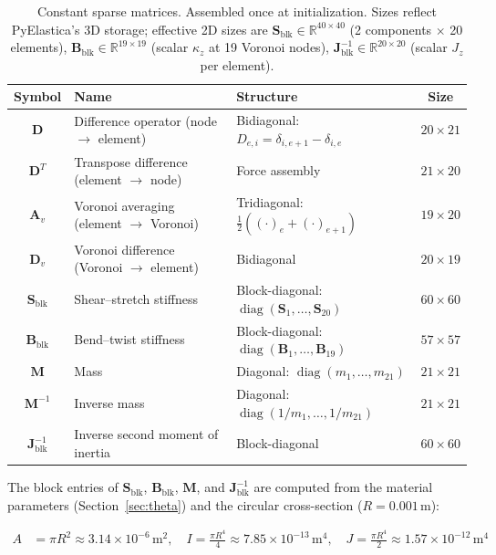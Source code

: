 \documentclass[11pt]{article}
\newcommand{\mat}[1]{\mathbf{#1}}
\newcommand{\Real}{\mathbb{R}}
\begin{document}
\begin{table}[H]
  \centering
  \renewcommand{\arraystretch}{1.3}
  \begin{tabular}{cllc}
    \toprule
    Symbol & Name & Structure & Size \\
    \midrule
    $\mat{D}$ & Difference operator (node $\to$ element) & Bidiagonal: $D_{e,i} = \delta_{i,e+1} - \delta_{i,e}$ & $20 \times 21$ \\
    $\mat{D}^T$ & Transpose difference (element $\to$ node) & Force assembly & $21 \times 20$ \\
    $\mat{A}_v$ & Voronoi averaging (element $\to$ Voronoi) & Tridiagonal: $\tfrac{1}{2}((\cdot)_e + (\cdot)_{e+1})$ & $19 \times 20$ \\
    $\mat{D}_v$ & Voronoi difference (Voronoi $\to$ element) & Bidiagonal & $20 \times 19$ \\
    $\mat{S}_{\text{blk}}$ & Shear--stretch stiffness & Block-diagonal: $\operatorname{diag}(\mat{S}_1, \ldots, \mat{S}_{20})$ & $60 \times 60$ \\
    $\mat{B}_{\text{blk}}$ & Bend--twist stiffness & Block-diagonal: $\operatorname{diag}(\mat{B}_1, \ldots, \mat{B}_{19})$ & $57 \times 57$ \\
    $\mat{M}$ & Mass & Diagonal: $\operatorname{diag}(m_1, \ldots, m_{21})$ & $21 \times 21$ \\
    $\mat{M}^{-1}$ & Inverse mass & Diagonal: $\operatorname{diag}(1/m_1, \ldots, 1/m_{21})$ & $21 \times 21$ \\
    $\mat{J}_{\text{blk}}^{-1}$ & Inverse second moment of inertia & Block-diagonal & $60 \times 60$ \\
    \bottomrule
  \end{tabular}
  \caption{Constant sparse matrices.  Assembled once at initialization.
    Sizes reflect PyElastica's 3D storage; effective 2D sizes are $\mat{S}_{\text{blk}} \in \Real^{40 \times 40}$ (2 components $\times$ 20 elements), $\mat{B}_{\text{blk}} \in \Real^{19 \times 19}$ (scalar $\kappa_z$ at 19 Voronoi nodes), $\mat{J}_{\text{blk}}^{-1} \in \Real^{20 \times 20}$ (scalar $J_z$ per element).}
  \label{tab:constant-matrices}
\end{table}

\noindent
The block entries of $\mat{S}_{\text{blk}}$, $\mat{B}_{\text{blk}}$, $\mat{M}$, and $\mat{J}_{\text{blk}}^{-1}$ are computed from the material parameters (Section~\ref{sec:theta}) and the circular cross-section ($R = 0.001$\,m):

\begin{subequations}
\label{eq:block-entries}
\begin{align}
  A &= \pi R^2 \approx 3.14 \times 10^{-6}\,\text{m}^2, \quad
  I = \tfrac{\pi R^4}{4} \approx 7.85 \times 10^{-13}\,\text{m}^4, \quad
  J = \tfrac{\pi R^4}{2} \approx 1.57 \times 10^{-12}\,\text{m}^4
  \label{eq:cross-section-values}
\end{align}
\end{subequations}
\end{document}
